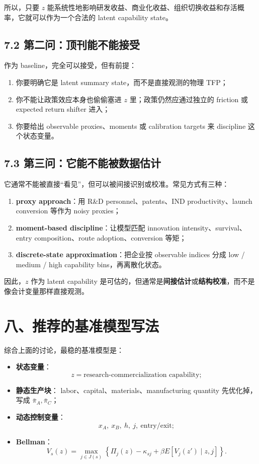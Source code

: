 \documentclass[12pt,fontset=none]{ctexart}
\begin{document}
所以，只要 \(z\) 能系统性地影响研发收益、商业化收益、组织切换收益和存活概率，它就可以作为一个合法的 latent capability state。

\subsection{7.2 第二问：顶刊能不能接受}

作为 baseline，完全可以接受，但有前提：

\begin{enumerate}[leftmargin=2em]
    \item 你要明确它是 latent summary state，而不是直接观测的物理 TFP；
    \item 你不能让政策效应本身也偷偷塞进 \(z\) 里；政策仍然应通过独立的 friction 或 expected return shifter 进入；
    \item 你要给出 observable proxies、moments 或 calibration targets 来 discipline 这个状态变量。
\end{enumerate}

\subsection{7.3 第三问：它能不能被数据估计}

它通常不能被直接“看见”，但可以被间接识别或校准。常见方式有三种：

\begin{enumerate}[leftmargin=2em]
    \item \textbf{proxy approach}：用 R\&D personnel、patents、IND productivity、launch conversion 等作为 noisy proxies；
    \item \textbf{moment-based discipline}：让模型匹配 innovation intensity、survival、entry composition、route adoption、conversion 等矩；
    \item \textbf{discrete-state approximation}：把企业按 observable indices 分成 low / medium / high capability bins，再离散化状态。
\end{enumerate}

因此，\(z\) 作为 latent capability 是可估的，但通常是\textbf{间接估计}或\textbf{结构校准}，而不是像会计变量那样直接观测。

\section{八、推荐的基准模型写法}

综合上面的讨论，最稳的基准模型是：

\begin{itemize}[leftmargin=2em]
    \item \textbf{状态变量}：
    \[
    z=\text{research-commercialization capability};
    \]
    \item \textbf{静态生产块}：
    labor、capital、materials、manufacturing quantity 先优化掉，写成 \(\bar{\pi}_A,\bar{\pi}_C\)；
    \item \textbf{动态控制变量}：
    \[
    x_A,\ x_B,\ h,\ j,\ \text{entry/exit};
    \]
    \item \textbf{Bellman}：
    \[
    V_s(z)=\max_{j\in J(s)}
    \left\{
    \Pi_j(z)-\kappa_{sj}+\beta E[V_j(z')\mid z,j]
    \right\}.
    \]
\end{itemize}
\end{document}
